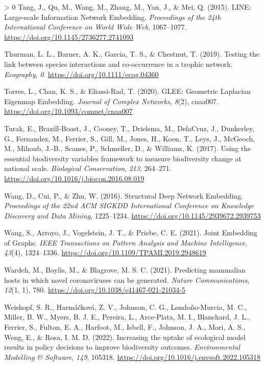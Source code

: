 \documentclass[11pt]{article}
\newlength{\cslhangindent}
\newenvironment{CSLReferences}[3] %
 {%
  \setlength{\parindent}{0pt}
  \ifodd #1 \everypar{\setlength{\hangindent}{\cslhangindent}}\ignorespaces\fi
  \ifnum #2 > 0
  \setlength{\parskip}{#2\baselineskip}
  \fi
 }%
 {}
\begin{document}
\begin{CSLReferences}{1}{0}
\leavevmode\hypertarget{ref-Tang2015LinLar}{}%
Tang, J., Qu, M., Wang, M., Zhang, M., Yan, J., \& Mei, Q. (2015). LINE:
Large-scale Information Network Embedding. \emph{Proceedings of the 24th
International Conference on World Wide Web}, 1067--1077.
\url{https://doi.org/10.1145/2736277.2741093}

\leavevmode\hypertarget{ref-Thurman2019TesLin}{}%
Thurman, L. L., Barner, A. K., Garcia, T. S., \& Chestnut, T. (2019).
Testing the link between species interactions and co-occurrence in a
trophic network. \emph{Ecography}, \emph{0}.
\url{https://doi.org/10.1111/ecog.04360}

\leavevmode\hypertarget{ref-Torres2020GleGeo}{}%
Torres, L., Chan, K. S., \& Eliassi-Rad, T. (2020). GLEE: Geometric
Laplacian Eigenmap Embedding. \emph{Journal of Complex Networks},
\emph{8}(2), cnaa007. \url{https://doi.org/10.1093/comnet/cnaa007}

\leavevmode\hypertarget{ref-Turak2017UsiEss}{}%
Turak, E., Brazill-Boast, J., Cooney, T., Drielsma, M., DelaCruz, J.,
Dunkerley, G., Fernandez, M., Ferrier, S., Gill, M., Jones, H., Koen,
T., Leys, J., McGeoch, M., Mihoub, J.-B., Scanes, P., Schmeller, D., \&
Williams, K. (2017). Using the essential biodiversity variables
framework to measure biodiversity change at national scale.
\emph{Biological Conservation}, \emph{213}, 264--271.
\url{https://doi.org/10.1016/j.biocon.2016.08.019}

\leavevmode\hypertarget{ref-Wang2016StrDee}{}%
Wang, D., Cui, P., \& Zhu, W. (2016). Structural Deep Network Embedding.
\emph{Proceedings of the 22nd ACM SIGKDD International Conference on
Knowledge Discovery and Data Mining}, 1225--1234.
\url{https://doi.org/10.1145/2939672.2939753}

\leavevmode\hypertarget{ref-Wang2021JoiEmb}{}%
Wang, S., Arroyo, J., Vogelstein, J. T., \& Priebe, C. E. (2021). Joint
Embedding of Graphs. \emph{IEEE Transactions on Pattern Analysis and
Machine Intelligence}, \emph{43}(4), 1324--1336.
\url{https://doi.org/10.1109/TPAMI.2019.2948619}

\leavevmode\hypertarget{ref-Wardeh2021PreMam}{}%
Wardeh, M., Baylis, M., \& Blagrove, M. S. C. (2021). Predicting
mammalian hosts in which novel coronaviruses can be generated.
\emph{Nature Communications}, \emph{12}(1, 1), 780.
\url{https://doi.org/10.1038/s41467-021-21034-5}

\leavevmode\hypertarget{ref-Weiskopf2022IncUpt}{}%
Weiskopf, S. R., Harmáčková, Z. V., Johnson, C. G., Londoño-Murcia, M.
C., Miller, B. W., Myers, B. J. E., Pereira, L., Arce-Plata, M. I.,
Blanchard, J. L., Ferrier, S., Fulton, E. A., Harfoot, M., Isbell, F.,
Johnson, J. A., Mori, A. S., Weng, E., \& Rosa, I. M. D. (2022).
Increasing the uptake of ecological model results in policy decisions to
improve biodiversity outcomes. \emph{Environmental Modelling \&
Software}, \emph{149}, 105318.
\url{https://doi.org/10.1016/j.envsoft.2022.105318}


\end{CSLReferences}
\end{document}
